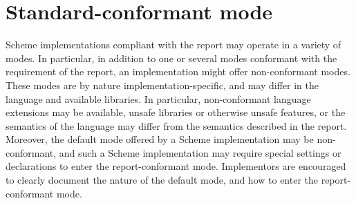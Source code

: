 \chapter{Standard-conformant mode}
\label{standardconformantmode}

Scheme implementations compliant with the report may operate in a
variety of modes.  In particular, in addition to one or several modes
conformant with the requirement of the report, an implementation might
offer non-conformant modes.  These modes are by nature
implementation-specific, and may differ in the language and available
libraries.  In particular, non-conformant language extensions may be
available, unsafe libraries or otherwise unsafe features, or the
semantics of the language may differ from the semantics described in
the report.  Moreover, the default mode offered by a Scheme
implementation may be non-conformant, and such a Scheme implementation
may require special settings or declarations to enter the
report-conformant mode.  Implementors are encouraged to clearly
document the nature of the default mode, and how to enter
the report-conformant mode.

